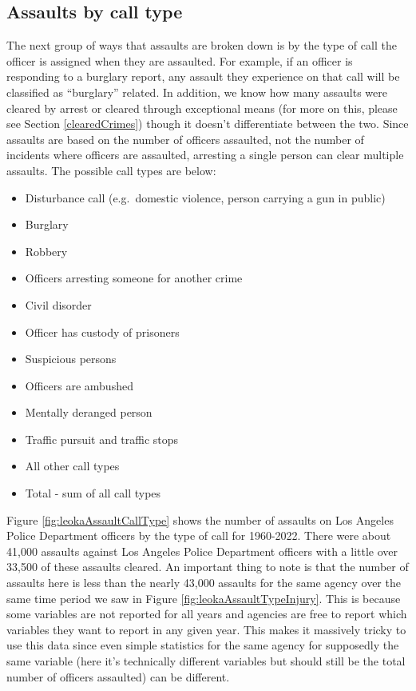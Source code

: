 \documentclass[
]{krantz}
\providecommand{\tightlist}{%
  \setlength{\itemsep}{0pt}\setlength{\parskip}{0pt}}
\begin{document}
\subsection{Assaults by call
type}\label{assaults-by-call-type}

The next group of ways that assaults are broken down is by
the type of call the officer is assigned when they are
assaulted. For example, if an officer is responding to a
burglary report, any assault they experience on that call
will be classified as ``burglary'' related. In addition, we
know how many assaults were cleared by arrest or cleared
through exceptional means (for more on this, please see
Section \ref{clearedCrimes}) though it doesn't differentiate
between the two. Since assaults are based on the number of
officers assaulted, not the number of incidents where
officers are assaulted, arresting a single person can clear
multiple assaults. The possible call types are below:

\begin{itemize}
\tightlist
\item
  Disturbance call (e.g.~domestic violence, person carrying
  a gun in public)
\item
  Burglary
\item
  Robbery
\item
  Officers arresting someone for another crime
\item
  Civil disorder
\item
  Officer has custody of prisoners
\item
  Suspicious persons
\item
  Officers are ambushed
\item
  Mentally deranged person
\item
  Traffic pursuit and traffic stops
\item
  All other call types
\item
  Total - sum of all call types
\end{itemize}

Figure \ref{fig:leokaAssaultCallType} shows the number of
assaults on Los Angeles Police Department officers by the
type of call for 1960-2022. There were about 41,000 assaults
against Los Angeles Police Department officers with a little
over 33,500 of these assaults cleared. An important thing to
note is that the number of assaults here is less than the
nearly 43,000 assaults for the same agency over the same
time period we saw in Figure
\ref{fig:leokaAssaultTypeInjury}. This is because some
variables are not reported for all years and agencies are
free to report which variables they want to report in any
given year. This makes it massively tricky to use this data
since even simple statistics for the same agency for
supposedly the same variable (here it's technically
different variables but should still be the total number of
officers assaulted) can be different.
\end{document}
